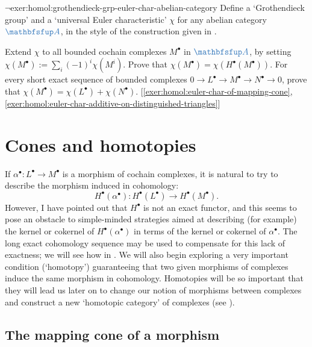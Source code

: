 \begin{exer}{$\lnot$}{exer:homol:grothendieck-grp-euler-char-abelian-category}
  Define a `Grothendieck group' and a `universal Euler characteristic'
  $\chi$ for any abelian category $\categ{A}$, in the style of the
  construction given in
  .

  Extend $\chi$ to all bounded cochain complexes $M^\bullet$ in
  $\categ{A}$, by setting
  $\chi(M^\bullet) := \sum_i (-1)^i \chi(M^i)$. Prove that
  $\chi(M^\bullet) = \chi(H^\bullet(M^\bullet))$. For every short
  exact sequence of bounded complexes
  $0 \to L^\bullet \to M^\bullet \to N^\bullet \to 0$, prove that
  $\chi(M^\bullet) = \chi(L^\bullet) +
  \chi(N^\bullet)$. [\ref{exer:homol:euler-char-of-mapping-cone},
  \ref{exer:homol:euler-char-additive-on-distinguished-triangles}]
\end{exer}

\section{Cones and homotopies}
\label{sec:homol:cones-and-homotopies}

If $\alpha^\bullet : L^\bullet \to M^\bullet$ is a morphism of cochain
complexes, it is natural to try to describe the morphism induced in
cohomology:
\[
  H^\bullet(\alpha^\bullet) : H^\bullet(L^\bullet) \to
  H^\bullet(M^\bullet).
\]
However, I have pointed out that $H^\bullet$ is not an exact functor,
and this seems to pose an obstacle to simple-minded strategies aimed
at describing (for example) the kernel or cokernel of
$H^\bullet(\alpha^\bullet)$ in terms of the kernel or cokernel of
$\alpha^\bullet$. The long exact cohomology sequence may be used to
compensate for this lack of exactness; we will see how in
. We will also
begin exploring a very important condition (`homotopy') guaranteeing
that two given morphisms of complexes induce the same morphism in
cohomology. Homotopies will be so important that they will lead us
later on to change our notion of morphisms between complexes and
construct a new `homotopic category' of complexes (see
).

\subsection{The mapping cone of a morphism}
\label{subsec:homol:the-mapping-cone-of-a-morphism}

